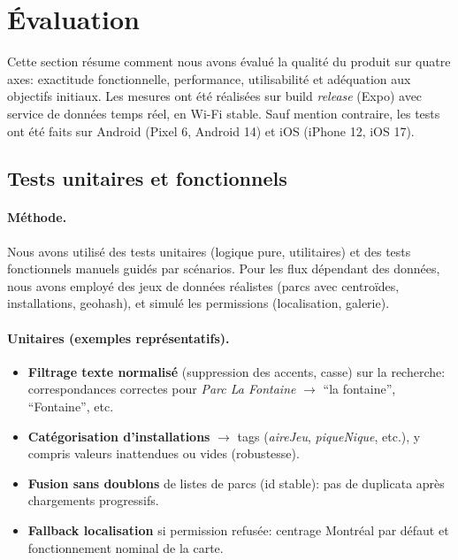 \documentclass[12pt,a4paper]{article}
\begin{document}


\clearpage
\section{Évaluation}

Cette section résume comment nous avons évalué la qualité du produit sur quatre axes: exactitude fonctionnelle, performance, utilisabilité et adéquation aux objectifs initiaux. Les mesures ont été réalisées sur build \emph{release} (Expo) avec service de données temps réel, en Wi-Fi stable. Sauf mention contraire, les tests ont été faits sur Android (Pixel 6, Android 14) et iOS (iPhone 12, iOS 17).

\subsection{Tests unitaires et fonctionnels}

\paragraph{Méthode.}
Nous avons utilisé des tests unitaires (logique pure, utilitaires) et des tests fonctionnels manuels guidés par scénarios. Pour les flux dépendant des données, nous avons employé des jeux de données réalistes (parcs avec centroïdes, installations, geohash), et simulé les permissions (localisation, galerie).

\paragraph{Unitaires (exemples représentatifs).}
\begin{itemize}
  \item \textbf{Filtrage texte normalisé} (suppression des accents, casse) sur la recherche: correspondances correctes pour \emph{Parc La Fontaine} \(\rightarrow\) ``la fontaine'', ``Fontaine'', etc.
  \item \textbf{Catégorisation d’installations} \(\rightarrow\) tags (\emph{aireJeu}, \emph{piqueNique}, etc.), y compris valeurs inattendues ou vides (robustesse).
  \item \textbf{Fusion sans doublons} de listes de parcs (id stable): pas de duplicata après chargements progressifs.
  \item \textbf{Fallback localisation} si permission refusée: centrage Montréal par défaut et fonctionnement nominal de la carte.
\end{itemize}
\end{document}
